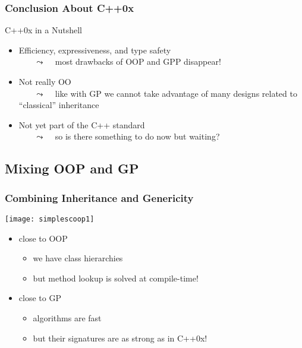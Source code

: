 \begin{frame}
  \frametitle{Conclusion About C++0x}

\begin{block}{C++0x in a Nutshell}
  \begin{itemize}
  \item[\bplus] Efficiency, expressiveness, and type safety \\
    ~~~ {\tiny{$\leadsto$ ~ most drawbacks of OOP and GPP disappear!}}
  \item[\bminus] Not really OO \\
    ~~~ {\tiny{$\leadsto$ ~ like with GP we cannot take advantage of many designs related to ``classical'' inheritance}}
  \item[\bminus] Not yet part of the C++ standard \\
    ~~~ {\tiny{$\leadsto$ ~ so is there something to do now but waiting?}}
  \end{itemize}
\end{block}

\end{frame}




\subsection{Mixing OOP and GP}



\begin{frame}
  \frametitle{Combining Inheritance and Genericity}

\begin{multicols}{2}
%
  \begin{center}
    \texttt{[image: simplescoop1]}
  \end{center}
%
\columnbreak
%
\vspace*{.2\textheight}
\begin{itemize}
\item close to OOP
  \begin{itemize}
  \item we have class hierarchies
  \item but method lookup is solved at compile-time!
  \end{itemize}
\item close to GP
  \begin{itemize}
  \item algorithms are fast
  \item but their signatures are as strong as in C++0x!
  \end{itemize}
\end{itemize}
%
\end{multicols}

\end{frame}



